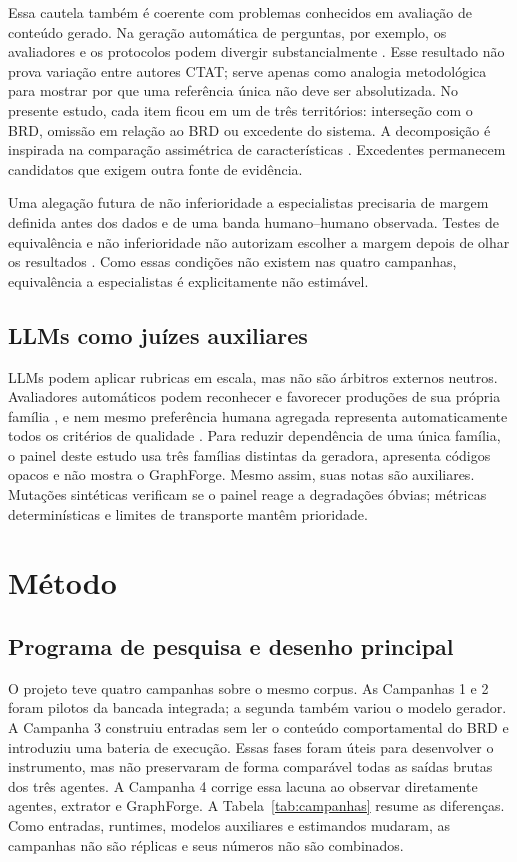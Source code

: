 \documentclass[11pt,a4paper]{article}
\begin{document}
Essa cautela também é coerente com problemas conhecidos em avaliação de conteúdo gerado. Na geração automática de perguntas, por exemplo, os avaliadores e os protocolos podem divergir substancialmente \citep{amidei2018}. Esse resultado não prova variação entre autores CTAT; serve apenas como analogia metodológica para mostrar por que uma referência única não deve ser absolutizada. No presente estudo, cada item ficou em um de três territórios: interseção com o BRD, omissão em relação ao BRD ou excedente do sistema. A decomposição é inspirada na comparação assimétrica de características \citep{tversky1977}. Excedentes permanecem candidatos que exigem outra fonte de evidência.

Uma alegação futura de não inferioridade a especialistas precisaria de margem definida antes dos dados e de uma banda humano--humano observada. Testes de equivalência e não inferioridade não autorizam escolher a margem depois de olhar os resultados \citep{lakens2017,lakens2018}. Como essas condições não existem nas quatro campanhas, equivalência a especialistas é explicitamente não estimável.

\subsection{LLMs como juízes auxiliares}

LLMs podem aplicar rubricas em escala, mas não são árbitros externos neutros. Avaliadores automáticos podem reconhecer e favorecer produções de sua própria família \citep{panickssery2024}, e nem mesmo preferência humana agregada representa automaticamente todos os critérios de qualidade \citep{hosking2024}. Para reduzir dependência de uma única família, o painel deste estudo usa três famílias distintas da geradora, apresenta códigos opacos e não mostra o GraphForge. Mesmo assim, suas notas são auxiliares. Mutações sintéticas verificam se o painel reage a degradações óbvias; métricas determinísticas e limites de transporte mantêm prioridade.

\section{Método}

\subsection{Programa de pesquisa e desenho principal}

O projeto teve quatro campanhas sobre o mesmo corpus. As Campanhas 1 e 2 foram pilotos da bancada integrada; a segunda também variou o modelo gerador. A Campanha 3 construiu entradas sem ler o conteúdo comportamental do BRD e introduziu uma bateria de execução. Essas fases foram úteis para desenvolver o instrumento, mas não preservaram de forma comparável todas as saídas brutas dos três agentes. A Campanha 4 corrige essa lacuna ao observar diretamente agentes, extrator e GraphForge. A Tabela~\ref{tab:campanhas} resume as diferenças. Como entradas, runtimes, modelos auxiliares e estimandos mudaram, as campanhas não são réplicas e seus números não são combinados.
\end{document}
